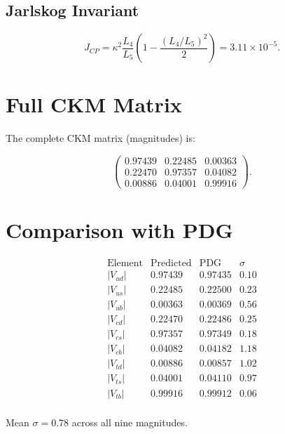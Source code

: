 \subsection{Jarlskog Invariant}

\[
J_{CP} = \kappa^2 \frac{L_4}{L_5}
         \left(1 - \frac{(L_4/L_5)^2}{2}\right)
       = 3.11 \times 10^{-5}.
\label{eq:jcp}
\]

\section{Full CKM Matrix}

The complete CKM matrix (magnitudes) is:

\[
\begin{pmatrix}
0.97439 & 0.22485 & 0.00363 \\
0.22470 & 0.97357 & 0.04082 \\
0.00886 & 0.04001 & 0.99916
\end{pmatrix}.
\]

\section{Comparison with PDG}

\[
\begin{array}{lccc}
\text{Element} & \text{Predicted} & \text{PDG} & \sigma \\
\hline
|V_{ud}| & 0.97439 & 0.97435 & 0.10 \\
|V_{us}| & 0.22485 & 0.22500 & 0.23 \\
|V_{ub}| & 0.00363 & 0.00369 & 0.56 \\
|V_{cd}| & 0.22470 & 0.22486 & 0.25 \\
|V_{cs}| & 0.97357 & 0.97349 & 0.18 \\
|V_{cb}| & 0.04082 & 0.04182 & 1.18 \\
|V_{td}| & 0.00886 & 0.00857 & 1.02 \\
|V_{ts}| & 0.04001 & 0.04110 & 0.97 \\
|V_{tb}| & 0.99916 & 0.99912 & 0.06 \\
\end{array}
\]

Mean \(\sigma = 0.78\) across all nine magnitudes.

